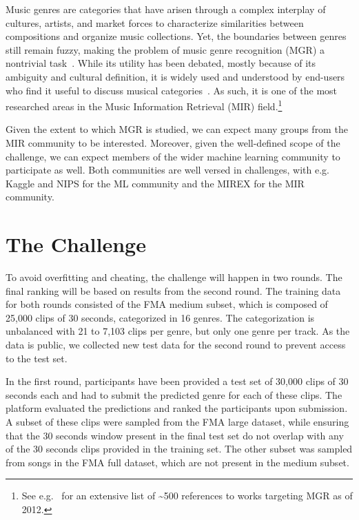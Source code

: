 \documentclass[sigconf]{acmart}
\begin{document}
Music genres are categories that have arisen through a complex interplay of cultures, artists, and market forces to characterize similarities between compositions and organize music collections. Yet, the boundaries between genres still remain fuzzy, making the problem of music genre recognition (MGR) a nontrivial task~\cite{mir_review_genre}. While its utility has been debated, mostly because of its ambiguity and cultural definition, it is widely used and understood by end-users who find it useful to discuss musical categories~\cite{mgr_why}. As such, it is one of the most researched areas in the Music Information Retrieval (MIR) field.\footnote{See e.g.\ \cite{mgr_eval_1} for an extensive list of \textasciitilde500 references to works targeting MGR as of 2012.}

Given the extent to which MGR is studied, we can expect many groups from the MIR community to be interested. Moreover, given the well-defined scope of the challenge, we can expect members of the wider machine learning community to participate as well. Both communities are well versed in challenges, with e.g. Kaggle and NIPS for the ML community and the MIREX for the MIR community.

\section{The Challenge}

To avoid overfitting and cheating, the challenge will happen in two rounds. The final ranking will be based on results from the second round.
The training data for both rounds consisted of the FMA medium subset, which is composed of 25,000 clips of 30 seconds, categorized in 16 genres. The categorization is unbalanced with 21 to 7,103 clips per genre, but only one genre per track. As the data is public, we collected new test data for the second round to prevent access to the test set.

In the first round, participants have been provided a test set of 30,000 clips of 30 seconds each and had to submit the predicted genre for each of these clips. The platform evaluated the predictions and ranked the participants upon submission. A subset of these clips were sampled from the FMA large dataset, while ensuring that the 30 seconds window present in the final test set do not overlap with any of the 30 seconds clips provided in the training set. The other subset was sampled from songs in the FMA full dataset, which are not present in the medium subset.
\end{document}
